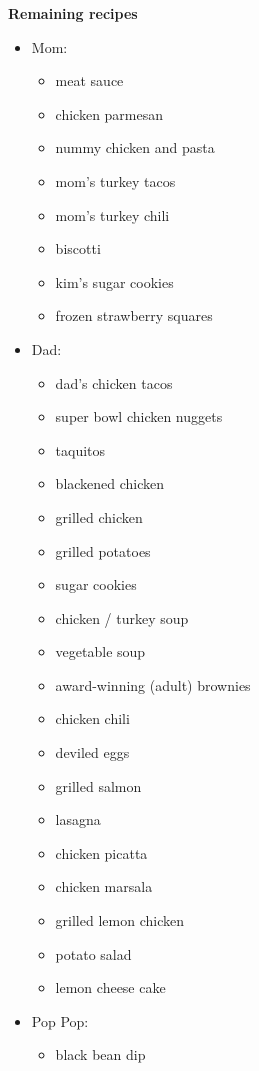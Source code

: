 \documentclass[11pt]{book}
\begin{document}
\newpage
\textbf{Remaining recipes}
\begin{itemize}
    \item Mom:
          \begin{itemize}
              \item meat sauce
              \item chicken parmesan
              \item nummy chicken and pasta
              \item mom's turkey tacos
              \item mom's turkey chili
              \item biscotti
              \item kim's sugar cookies
              \item frozen strawberry squares
          \end{itemize}

    \item Dad:
          \begin{itemize}
              \item dad's chicken tacos
              \item super bowl chicken nuggets
              \item taquitos
              \item blackened chicken
              \item grilled chicken
              \item grilled potatoes
              \item sugar cookies
              \item chicken / turkey soup
              \item vegetable soup
              \item award-winning (adult) brownies
              \item chicken chili
              \item deviled eggs
              \item grilled salmon
              \item lasagna
              \item chicken picatta
              \item chicken marsala
              \item grilled lemon chicken
              \item potato salad
              \item lemon cheese cake
          \end{itemize}

    \item Pop Pop:
          \begin{itemize}
              \item black bean dip
          \end{itemize}
\end{itemize}

\backmatter
\CookbookIndex{}
\end{document}
